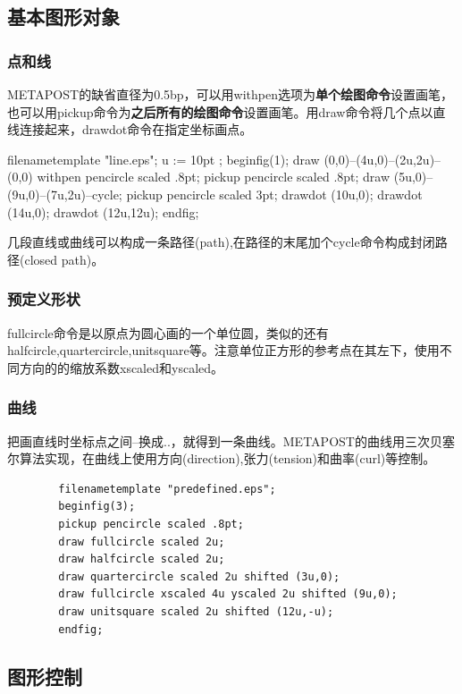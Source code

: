 \documentclass[16pt]{article}
\begin{document}
\subsection{基本图形对象}
\subsubsection{点和线} METAPOST的缺省直径为0.5bp，可以用withpen选项为\textbf{单个绘图命令}设置画笔，也可以用pickup命令为\textbf{之后所有的绘图命令}设置画笔。用draw命令将几个点以直线连接起来，drawdot命令在指定坐标画点。\par
    filenametemplate "line.eps";
    u := 10pt ;%
    beginfig(1);
    draw (0,0)--(4u,0)--(2u,2u)--(0,0) withpen pencircle scaled .8pt;
    pickup pencircle scaled .8pt;
    draw (5u,0)--(9u,0)--(7u,2u)--cycle;
    pickup pencircle scaled 3pt;
    drawdot (10u,0);
    drawdot (14u,0);
    drawdot (12u,12u);
    endfig;
    \par
    几段直线或曲线可以构成一条路径(path),在路径的末尾加个cycle命令构成封闭路径(closed path)。 \par
    
\subsubsection{预定义形状}
    fullcircle命令是以原点为圆心画的一个单位圆，类似的还有halfcircle,quartercircle,unitsquare等。注意单位正方形的参考点在其左下，使用不同方向的的缩放系数xscaled和yscaled。 \par
\subsubsection{曲线}
    把画直线时坐标点之间--换成..，就得到一条曲线。METAPOST的曲线用三次贝塞尔算法实现，在曲线上使用方向(direction),张力(tension)和曲率(curl)等控制。\par
    \begin{lstlisting}
        filenametemplate "predefined.eps";
        beginfig(3);
        pickup pencircle scaled .8pt;
        draw fullcircle scaled 2u;
        draw halfcircle scaled 2u;
        draw quartercircle scaled 2u shifted (3u,0);
        draw fullcircle xscaled 4u yscaled 2u shifted (9u,0);
        draw unitsquare scaled 2u shifted (12u,-u);
        endfig;
    \end{lstlisting}
\subsection{图形控制}
\end{document}

